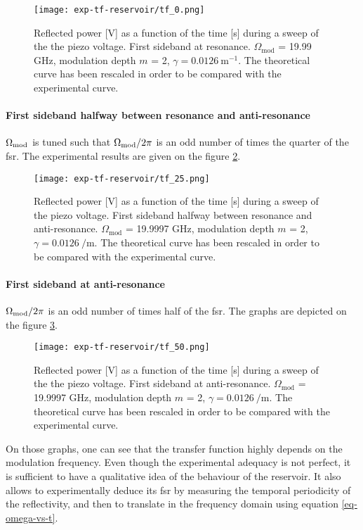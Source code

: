 \begin{figure}
	\centering
	\texttt{[image: exp-tf-reservoir/tf\_0.png]}
	\caption{Reflected power [V] as a function of the time [s] during a sweep of the the piezo voltage. First sideband at resonance. $\Omega_{\text{mod}}$ = 19.99 GHz, modulation depth $m$ = 2, $\gamma = 0.0126~\text{m}^{-1}$. The theoretical curve has been rescaled in order to be compared with the experimental curve.}
	\label{tf_0}
\end{figure}

\paragraph{First sideband halfway between resonance and anti-resonance} $\Omega_{\text{mod}}$ is tuned such that $\Omega_{\text{mod}}/2\pi$ is an odd number of times the quarter of the \gls{fsr}. The experimental results are given on the figure \ref{tf_25}.

\begin{figure}
	\centering
	\texttt{[image: exp-tf-reservoir/tf\_25.png]}
	\caption{Reflected power [V] as a function of the time [s] during a sweep of the piezo voltage. First sideband halfway between resonance and anti-resonance. $\Omega_{\text{mod}}$ = 19.9997 GHz, modulation depth $m$ = 2, $\gamma = \SI{0.0126}{\per\metre}$. The theoretical curve has been rescaled in order to be compared with the experimental curve.}
	\label{tf_25}
\end{figure}

\paragraph{First sideband at anti-resonance} $\Omega_{\text{mod}}/2\pi$ is an odd number of times half of the \gls{fsr}. The graphs are depicted on the figure \ref{tf_50}.\\

\begin{figure}
	\centering
	\texttt{[image: exp-tf-reservoir/tf\_50.png]}
	\caption{Reflected power [V] as a function of the time [s] during a sweep of the the piezo voltage. First sideband at anti-resonance. $\Omega_{\text{mod}}$ = 19.9997 GHz, modulation depth $m$ = 2, $\gamma = \SI{0.0126}{\per\metre}$. The theoretical curve has been rescaled in order to be compared with the experimental curve.}
	\label{tf_50}
\end{figure}

On those graphs, one can see that the transfer function highly depends on the modulation frequency. Even though the experimental adequacy is not perfect, it is sufficient to have a qualitative idea of the behaviour of the reservoir. It also allows to experimentally deduce its \gls{fsr} by measuring the temporal periodicity of the reflectivity, and then to translate in the frequency domain using equation \eqref{eq-omega-vs-t}.

